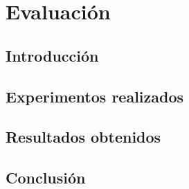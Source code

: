 
\chapter{Evaluación}

\label{chap6:evaluacion}

\section{Introducción}

\section{Experimentos realizados}

\section{Resultados obtenidos}

\section{Conclusión}
